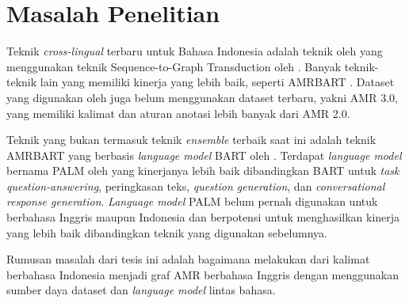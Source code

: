 \section{Masalah Penelitian}

Teknik \textit{cross-lingual} \amrparsing{} terbaru untuk Bahasa Indonesia adalah teknik oleh \textcite{putra2022} yang menggunakan teknik Sequence-to-Graph Transduction oleh .
Banyak teknik-teknik lain yang memiliki kinerja \amrparsing{} yang lebih baik, seperti AMRBART .
Dataset yang digunakan oleh \textcite{putra2022} juga belum menggunakan dataset terbaru, yakni AMR 3.0, yang memiliki kalimat dan aturan anotasi lebih banyak dari AMR 2.0.

Teknik \amrparsing{} yang bukan termasuk teknik \textit{ensemble} terbaik saat ini adalah teknik AMRBART yang berbasis \textit{language model} BART oleh \textcite{lewis2020}.
Terdapat \textit{language model} bernama PALM oleh \textcite{bi2020} yang kinerjanya lebih baik dibandingkan BART untuk \textit{task} \textit{question-answering}, peringkasan teks, \textit{question generation}, dan \textit{conversational response generation}.
\textit{Language model} PALM belum pernah digunakan untuk \amrparsing{} berbahasa Inggris maupun Indonesia dan berpotensi untuk menghasilkan kinerja yang lebih baik dibandingkan teknik yang digunakan sebelumnya.

Rumusan masalah dari tesis ini adalah bagaimana melakukan \amrparsing{} dari kalimat berbahasa Indonesia menjadi graf \gls{AMR} berbahasa Inggris dengan menggunakan sumber daya dataset dan \textit{language model} lintas bahasa.
